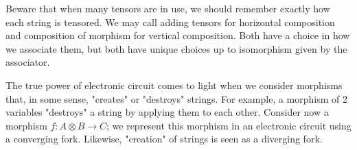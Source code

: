 \documentclass[../thesis.tex]{subfiles}
\begin{document}
            Beware that when many tensors are in use, we should remember exactly how each string is tensored. We may call adding tensors for horizontal composition and composition of morphism for vertical composition. Both have a choice in how we associate them, but both have unique choices up to isomorphism given by the associator. 
            \begin{center}
            \end{center}

            The true power of electronic circuit comes to light when we consider morphisms that, in some sense, "creates" or "destroys" strings. For example, a morphism of 2 variables "destroys" a string by applying them to each other. Consider now a morphism $f: A \otimes B \rightarrow C$; we represent this morphism in an electronic circuit using a converging fork. Likewise, "creation" of strings is seen as a diverging fork.
            \begin{center}
            \end{center}
\end{document}
